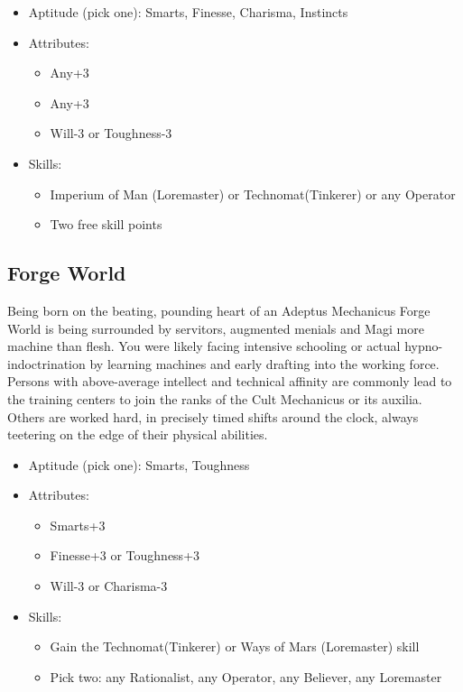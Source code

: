 	\begin{itemize}
		\item Aptitude (pick one): Smarts, Finesse, Charisma, Instincts
		\item Attributes:
		\begin{itemize}
			\item Any+3
			\item Any+3
			\item Will-3 or Toughness-3
		\end{itemize}
		\item Skills: 
		\begin{itemize}
		 	\item Imperium of Man (Loremaster) or Technomat(Tinkerer) or any Operator
		 	\item Two free skill points
		 \end{itemize} 
	\end{itemize}

	\subsection{Forge World}
	Being born on the beating, pounding heart of an Adeptus Mechanicus Forge World is being surrounded by servitors, augmented menials and Magi more machine than flesh. You were likely facing intensive schooling or actual hypno-indoctrination by learning machines and early drafting into the working force. Persons with above-average intellect and technical affinity are commonly lead to the training centers to join the ranks of the Cult Mechanicus or its auxilia. Others are worked hard, in precisely timed shifts around the clock, always teetering on the edge of their physical abilities.

	\begin{itemize}
		\item Aptitude (pick one): Smarts, Toughness
		\item Attributes:
		\begin{itemize}
			\item Smarts+3
			\item Finesse+3 or Toughness+3
			\item Will-3 or Charisma-3
		\end{itemize}
		\item Skills: 
		\begin{itemize}
		 	\item Gain the Technomat(Tinkerer) or Ways of Mars (Loremaster) skill
		 	\item Pick two: any Rationalist, any Operator, any Believer, any Loremaster
		 \end{itemize} 
	\end{itemize}

